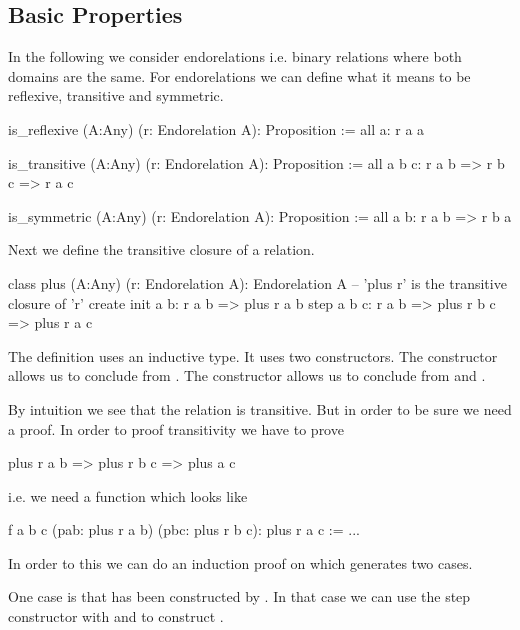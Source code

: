 \subsection{Basic Properties}


In the following we consider endorelations i.e. binary relations where both
domains are the same. For endorelations we can define what it means to be
reflexive, transitive and symmetric.

\begin{alba}
  is_reflexive (A:Any) (r: Endorelation A): Proposition :=
    all a: r a a

  is_transitive (A:Any) (r: Endorelation A): Proposition :=
    all a b c: r a b => r b c => r a c

  is_symmetric (A:Any) (r: Endorelation A): Proposition :=
    all a b: r a b => r b a
\end{alba}


Next we define the transitive closure of a relation.

\begin{alba}
  class
    plus (A:Any) (r: Endorelation A): Endorelation A
      -- 'plus r' is the transitive closure of 'r'
  create
    init a b:
      r a b
      => plus r a b
    step a b c:
      r a b
      => plus r b c
      => plus r a c
\end{alba}

The definition uses an inductive type. It uses two constructors. The
 constructor allows us to conclude  from .
The  constructor allows us to conclude  from
 and .

By intuition we see that the relation  is transitive. But in
order to be sure we need a proof. In order to proof transitivity we have to
prove
%
\begin{alba}
  plus r a b => plus r b c => plus a c
\end{alba}
%
i.e. we need a function which looks like
%
\begin{alba}
  f a b c (pab: plus r a b) (pbc: plus r b c): plus r a c :=
    ...
\end{alba}
%
In order to this we can do an induction proof on  which
generates two cases.

One case is that  has been constructed
by . In that case we can use the step constructor with
 and  to construct .

